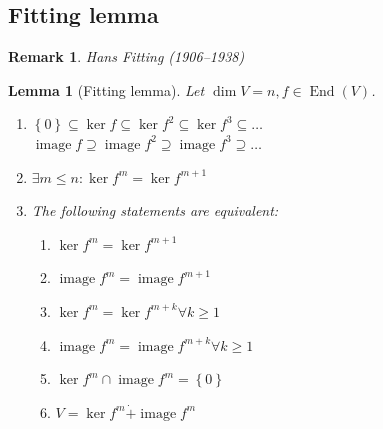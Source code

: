 \documentclass{article}
\newtheorem{lemma}{Lemma}  \numberwithin{lemma}{section}
\newtheorem{remark}{Remark}  \numberwithin{remark}{section}
\newcommand{\set}[1]{\left\{#1\right\}}
\DeclareMathOperator{\im}{image}
\begin{document}
\subsection{Fitting lemma}

\begin{remark}
  Hans Fitting (1906--1938)
\end{remark}

\begin{lemma}[Fitting lemma]
  Let $\dim{V} = n, f \in \operatorname{End}(V)$.
  \begin{enumerate}
    \item $\set{0} \subseteq \ker{f} \subseteq \ker{f^2} \subseteq \ker{f^3} \subseteq \dots$ \\
          $\im{f} \supseteq \im{f^2} \supseteq \im{f^3} \supseteq \dots$
    \item $\exists m \leq n: \ker{f^m} = \ker{f^{m+1}}$
    \item The following statements are equivalent:
      \begin{enumerate}
        \item $\ker{f^m} = \ker{f^{m+1}}$
        \item $\im{f^m} = \im{f^{m+1}}$
        \item $\ker{f^m} = \ker{f^{m+k}} \forall k \geq 1$
        \item $\im{f^m} = \im{f^{m+k}} \forall k \geq 1$
        \item $\ker{f^m} \cap \im{f^m} = \set{0}$
        \item $V = \ker{f^m} \dot{+} \im{f^m}$
      \end{enumerate}
  \end{enumerate}
\end{lemma}
\end{document}
